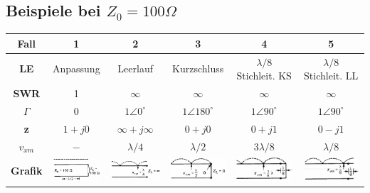 \subsection{Beispiele bei $Z_0=100\Omega$}
		\renewcommand{\arraystretch}{1.1}
		\begin{tabular}{| c | c | c | c | c | c |}
			\hline
				\textbf{Fall}
				& 1
				& 2 
				& 3
				& 4
				& 5 \\
			\hline
				\textbf{LE}
				& Anpassung
				& Leerlauf
				& Kurzschluss
				& $\lambda/8$ Stichleit. KS
				& $\lambda/8$ Stichleit. LL \\
			\hline
				\textbf{SWR}
				& 1
				& $\infty$
				& $\infty$
				& $\infty$
				& $\infty$ \\
			\hline
				\textbf{$\Gamma$}
				& $0$
				& $1 \angle 0 ^\circ$
				& $1 \angle 180 ^\circ$
				& $1 \angle 90 ^\circ$
				& $1 \angle 90 ^\circ$\\
			\hline
				\textbf{z}
				& $1+j0$
				& $\infty+j\infty$
				& $0+j0$
				& $0+j1$
				& $0-j1$ \\
			\hline
				\textbf{$v_{xm}$}
				& $-$
				& $\lambda/4$
				& $\lambda/2$
				& $3\lambda/8$
				& $\lambda/8$ \\
			\hline
				\textbf{Grafik}
				& \includegraphics[height=0.9cm]{./bilder/Fall1.png}
				& \includegraphics[height=0.9cm]{./bilder/Fall2.png}
				& \includegraphics[height=0.9cm]{./bilder/Fall3.png}
				& \includegraphics[height=0.9cm]{./bilder/Fall4.png}
				& \includegraphics[height=0.9cm]{./bilder/Fall5.png} \\
			\hline
		\end{tabular}
		\renewcommand{\arraystretch}{1}
		